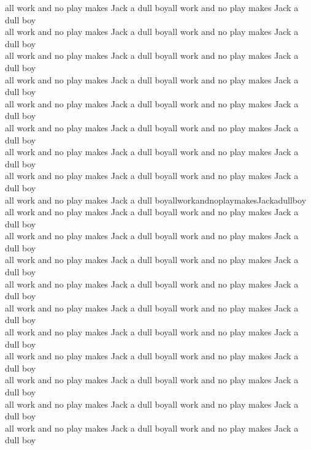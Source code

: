 \begin{ntquote}
all work and no play makes Jack a dull boy\quad\quad all work and no play makes Jack a dull boy\\
all work and no play makes Jack a dull boy\quad\quad all work and no play makes Jack a dull boy\\
all work and no play makes Jack a dull boy\quad\quad all work and no play makes Jack a dull boy\\
all work and no play makes Jack a dull boy\quad\quad all work and no play makes Jack a dull boy\\
all work and no play makes Jack a dull boy\quad\quad all work and no play makes Jack a dull boy\\
all work and no play makes Jack a dull boy\quad\quad all work and no play makes Jack a dull boy\\
all work and no play makes Jack a dull boy\quad\quad all work and no play makes Jack a dull boy\\
all work and no play makes Jack a dull boy\quad\quad all work and no play makes Jack a dull boy\\
all work and no play makes Jack a dull boy\quad\quad allworkandnoplaymakesJackadullboy\\
all work and no play makes Jack a dull boy\quad\quad all work and no play makes Jack a dull boy\\
all work and no play makes Jack a dull boy\quad\quad all work and no play makes Jack a dull boy\\
all work and no play makes Jack a dull boy\quad\quad all work and no play makes Jack a dull boy\\
all work and no play makes Jack a dull boy\quad\quad all work and no play makes Jack a dull boy\\
all work and no play makes Jack a dull boy\quad\quad all work and no play makes Jack a dull boy\\
all work and no play makes Jack a dull boy\quad\quad all work and no play makes Jack a dull boy\\
all work and no play makes Jack a dull boy\quad\quad all work and no play makes Jack a dull boy\\
all work and no play makes Jack a dull boy\quad\quad all work and no play makes Jack a dull boy\\
all work and no play makes Jack a dull boy\quad\quad all work and no play makes Jack a dull boy\\
all work and no play makes Jack a dull boy\quad\quad all work and no play makes Jack a dull boy\\

\end{ntquote}
